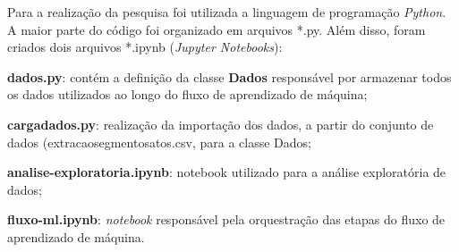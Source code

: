 Para a realização da pesquisa foi utilizada a linguagem de programação \textit{Python}. A maior parte do código foi organizado em arquivos *.py. Além disso, foram criados dois arquivos  *.ipynb (\textit{Jupyter Notebooks}):
\begin{alineas}
	\item \textbf{dados.py}: contém a definição da classe \textbf{Dados	} responsável por armazenar todos os dados utilizados ao longo do fluxo de aprendizado de máquina;
	\item \textbf{carga\textunderscore dados.py}: realização da importação dos dados, a partir do conjunto de dados (extracao\textunderscore segmentos\textunderscore atos.csv, para a classe Dados;
	\item \textbf{analise-exploratoria.ipynb}: notebook utilizado para a análise exploratória de dados;
	\item \textbf{fluxo-ml.ipynb}: \textit{notebook} responsável pela orquestração das etapas do fluxo de aprendizado de máquina.   
\end{alineas} 



